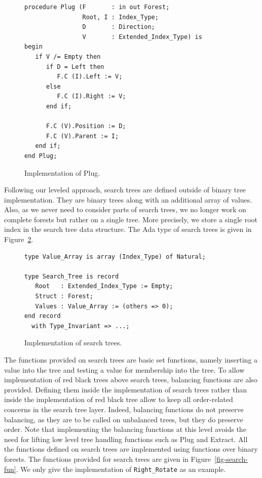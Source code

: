 \documentclass[11pt,a4paper]{article}
\begin{document}
\begin{figure}[ht]
\begin{small}
\begin{lstlisting}
procedure Plug (F       : in out Forest;
                Root, I : Index_Type;
                D       : Direction;
                V       : Extended_Index_Type) is
begin
   if V /= Empty then
      if D = Left then
         F.C (I).Left := V;
      else
         F.C (I).Right := V;
      end if;

      F.C (V).Position := D;
      F.C (V).Parent := I;
   end if;
end Plug;
\end{lstlisting}
\end{small}
\caption{\label{fig-binary-body} Implementation of Plug.}
\end{figure}

Following our leveled approach, search trees are defined outside of binary tree implementation.
They are binary trees along with an additional array of values. Also, as we never need to consider
parts of search trees, we no longer work on complete forests but rather on a single tree. More
precisely, we store a single root index in the search tree data structure.
The Ada type of search trees is given in Figure~\ref{fig-search-typ}.

\begin{figure}[ht]
\begin{small}
\begin{lstlisting}
type Value_Array is array (Index_Type) of Natural;

type Search_Tree is record
   Root   : Extended_Index_Type := Empty;
   Struct : Forest;
   Values : Value_Array := (others => 0);
end record
  with Type_Invariant => ...;
\end{lstlisting}
\end{small}
\caption{\label{fig-search-typ} Implementation of search trees.}
\end{figure}

The functions provided on search trees are basic set functions, namely inserting a value into the tree
and testing a value for membership into the tree. To allow implementation of red black trees above
search trees, balancing functions are also provided. Defining them inside the implementation of
search trees rather than inside the implementation of red black tree allow to keep all order-related
concerns in the search tree layer. Indeed, balancing functions do not preserve balancing, as they
are to be called on unbalanced trees, but they do preserve order. Note that implementing the balancing
functions at this level avoids the need for lifting low level tree handling functions such as Plug and
Extract. All the functions defined on search trees are implemented using
functions over binary forests. The functions provided for search trees are given in
Figure~\ref{fig-search-fun}. We only give the implementation of \verb|Right_Rotate| as an
example.
\end{document}
